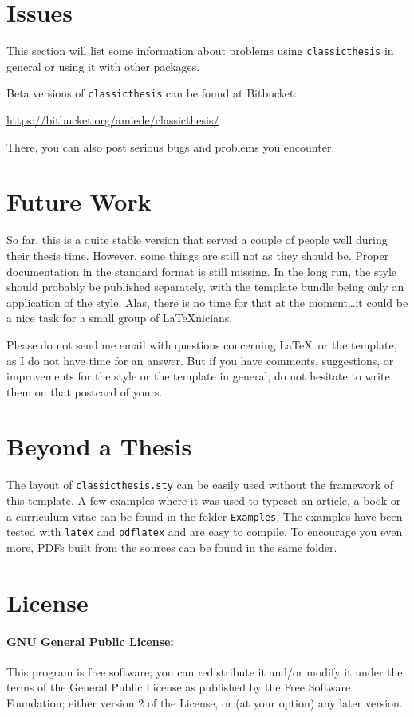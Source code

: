 \section{Issues}\label{sec:issues}
This section will list some information about problems using
\texttt{classic\-thesis} in general or using it with other packages.

Beta versions of \texttt{classicthesis} can be found at Bitbucket:
\begin{center}
    \url{https://bitbucket.org/amiede/classicthesis/}
\end{center}
There, you can also post serious bugs and problems you encounter.


\section{Future Work}
So far, this is a quite stable version that served a couple of people
well during their thesis time. However, some things are still not as
they should be. Proper documentation in the standard format is still
missing. In the long run, the style should probably be published
separately, with the template bundle being only an application of the
style. Alas, there is no time for that at the moment\dots it could be
a nice task for a small group of \LaTeX nicians.

Please do not send me email with questions concerning \LaTeX\ or the
template, as I do not have time for an answer. But if you have
comments, suggestions, or improvements for the style or the template
in general, do not hesitate to write them on that postcard of yours.


\section{Beyond a Thesis}
The layout of \texttt{classicthesis.sty} can be easily used without the
framework of this template. A few examples where it was used to typeset
an article, a book or a curriculum vitae can be found in the folder
\texttt{Examples}. The examples have been tested with
\texttt{latex} and \texttt{pdflatex} and are easy to compile. To
encourage you even more, PDFs built from the sources can be found in the
same folder.


\section{License}
\paragraph{GNU General Public License:} This program is free software;
you can redistribute it and/or modify
it under the terms of the  General Public License as
published by
the Free Software Foundation; either version 2 of the License, or
(at your option) any later version.

